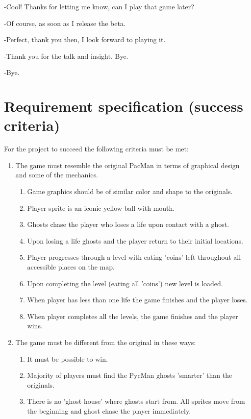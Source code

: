 \documentclass[11pt,a4paper]{report}
\begin{document}
			-Cool! Thanks for letting me know, can I play that game later?
			
			-Of course, as soon as I release the beta.
			
			-Perfect, thank you then, I look forward to playing it.
			
			-Thank you for the talk and insight. Bye.
			
			-Bye.
		\section{Requirement specification (success criteria)}
			For the project to succeed the following criteria must be met:\\
			\begin{enumerate}
				\item 
				The game must resemble the original PacMan in terms of graphical design and some of the mechanics.
				\begin{enumerate}
					\item
						Game graphics should be of similar color and shape to the originals.
					\item
						Player sprite is an iconic yellow ball with mouth.
					\item
						Ghosts chase the player who loses a life upon contact with a ghost.
					\item
						Upon losing a life ghosts and the player return to their initial locations.
					\item
						Player progresses through a level with eating 'coins' left throughout all accessible places on the map.
					\item
						Upon completing the level (eating all 'coins') new level is loaded.
					\item
						When player has less than one life the game finishes and the player loses.
					\item
						When player completes all the levels, the game finishes and the player wins.
				\end{enumerate}
				\item
					The game must be different from the original in these ways:
					\begin{enumerate}
					\item
						It must be possible to win.
					\item
						Majority of players must find the PycMan ghosts 'smarter' than the originals.
					\item
						There is no 'ghost house' where ghosts start from. All sprites move from the beginning and ghost chase the player immediately.

\end{enumerate}
\end{enumerate}
\end{document}
